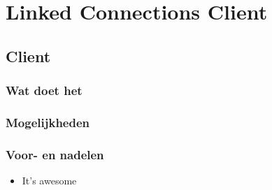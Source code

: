 
\chapter{Linked Connections Client}

\section{Client}

\subsection{Wat doet het}

\subsection{Mogelijkheden}


\subsection{Voor- en nadelen}

\begin{itemize}
\item It's awesome
\end{itemize}

